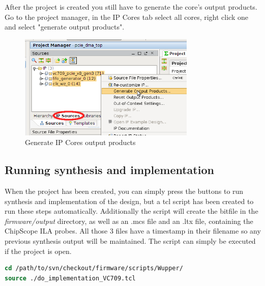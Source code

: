 After the project is created you still have to generate the core's output products. Go to the project manager, in the IP Cores tab select all cores, right click one and select "generate output products".
\begin{figure}[H]
\centering
\includegraphics[width=0.75\textwidth]{figures/generate_output_products.png}
\caption{Generate IP Cores output products}
\label{fig:generate_output_products}
\end{figure}
\subsection{Running synthesis and implementation}
When the project has been created, you can simply press the buttons to run synthesis and implementation of the design, but a tcl script has been created to run these steps automatically. Additionally the script will create the bitfile in the \textit{firmware/output} directory, as well as an .mcs file and an .ltx file, containing the ChipScope ILA probes. All those 3 files have a timestamp in their filename so any previous synthesis output will be maintained.
The script can simply be executed if the project is open. 
\begin{lstlisting}[frame=single, language=tcl, caption=start synthesis / implementation]
cd /path/to/svn/checkout/firmware/scripts/Wupper/
source ./do_implementation_VC709.tcl
\end{lstlisting}
\newpage


